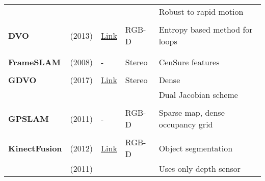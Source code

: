 {\begin{longtable}{l|l|l|l|l}
			&                                   &                                                                    &                       & Robust to rapid motion\\
			&                                   &                                                                    &                       &\\
			\textbf{DVO}           & \cite{Kerl2013} (2013)            & {\href{https://github.com/tum-vision/dvo_slam}{Link}}              & RGB-D                 & Entropy based method for loops\\
			&                                   &                                                                    &                       &\\
			&                                   &                                                                    &                       &\\
			\textbf{FrameSLAM}     & \cite{Konolige2008} (2008)        & -                                                                  & Stereo                & CenSure features\\
			&                                   &                                                                    &                       &\\
			\textbf{GDVO}          & \cite{Zhu2017} (2017)             & {\href{https://github.com/syywh/gdvo}{Link}}                       & Stereo                & Dense\\
			&                                   &                                                                    &                       & Dual Jacobian scheme\\
			&                                   &                                                                    &                       &\\
			\textbf{GPSLAM}        & \cite{Pirker2011a} (2011)         & -                                                                  & RGB-D                 & Sparse map, dense occupancy grid\\
			&                                   &                                                                    &                       &\\
			\textbf{KinectFusion}  & \cite{Pirovano2012} (2012)        & {\href{https://github.com/PointCloudLibrary/pcl}{Link}}            & RGB-D                 & Object segmentation\\
			& \cite{Izadi2011} (2011)           &                                                                    &                       & Uses only depth sensor\\

\end{longtable}}
